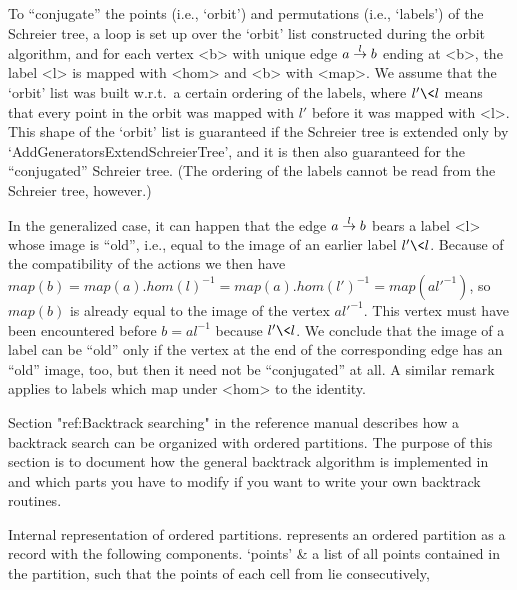 To ``conjugate''  the  points  (i.e., `orbit')  and  permutations  (i.e.,
`labels') of the Schreier  tree, a loop is  set up over the `orbit'  list
constructed  during the  orbit algorithm,  and for each  vertex  <b> with
unique edge $a\labelto l b$ ending at  <b>, the label  <l> is mapped with
<hom> and <b> with   <map>. We assume  that  the `orbit' list   was built
w.r.t.~a  certain ordering of the  labels, where $l'\<l$ means that every
point in the  orbit was mapped with  $l'$ before it  was mapped with <l>.
This shape of the  `orbit'  list is guaranteed if   the Schreier tree  is
extended only by  `AddGeneratorsExtendSchreierTree', and it  is then also
guaranteed  for the ``conjugated''  Schreier  tree. (The  ordering of the
labels cannot be read from the Schreier tree, however.)

In the generalized case, it   can happen that the   edge $a\labelto l  b$
bears a label <l> whose image is ``old'', i.e.,  equal to the image of an
earlier label  $l'\<l$. Because of  the  compatibility of the  actions we
then have   $map(b)    = map(a).  hom(l)^{-1}   =   map(a).hom(l')^{-1} =
map(a{l'}^{-1})$, so $map(b)$ is already equal to the image of the vertex
$a{l'}^{-1}$. This vertex must have been encountered before $b = al^{-1}$
because $l'\<l$. We  conclude that the image of   a label can  be ``old''
only if the vertex at  the end of  the corresponding edge has an  ``old''
image,  too, but then  it need  not be  ``conjugated''  at all. A similar
remark applies to labels which map under <hom> to the identity.


\begingroup%
\def\R{{\cal R}} \def\I{{\cal I}}%

Section "ref:Backtrack searching" in the reference manual describes how a
backtrack search can be organized with ordered partitions. The purpose of
this section  is  to document  how  the general   backtrack algorithm  is
implemented in {\GAP} and which  parts you have to modify  if you want to
write your own backtrack routines.

\medskip
{}%
{\bsf   Internal   representation  of  ordered  partitions.}\quad  {\GAP}
represents an   ordered   partition  as a  record    with   the following
components.
\beginitems
`points' &
        a list  of all points contained in  the  partition, such that the
        points of each cell from lie consecutively,

